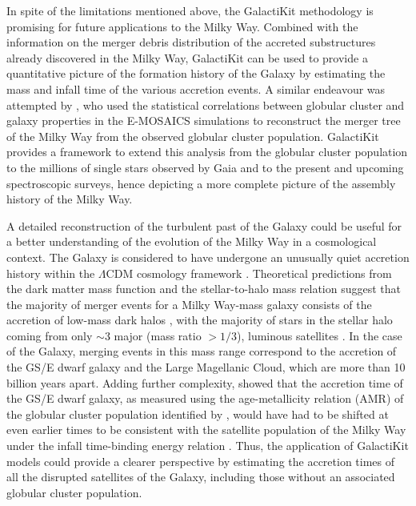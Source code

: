 In spite of the limitations mentioned above, the GalactiKit methodology is promising for future applications to the Milky Way. Combined with the information on the merger debris distribution of the accreted substructures already discovered in the Milky Way, GalactiKit can be used to provide a quantitative picture of the formation history of the Galaxy by estimating the mass and infall time of the various accretion events. A similar endeavour was attempted by \cite{Kruijssen2019b}, who used the statistical correlations between globular cluster and galaxy properties in the E-MOSAICS simulations \citep{Kruijssen2019a} to reconstruct the merger tree of the Milky Way from the observed globular cluster population. GalactiKit provides a framework to extend this analysis from the globular cluster population to the millions of single stars observed by Gaia and to the present and upcoming spectroscopic surveys, hence depicting a more complete picture of the assembly history of the Milky Way.


A detailed reconstruction of the turbulent past of the Galaxy could be useful for a better understanding of the evolution of the Milky Way in a cosmological context. The Galaxy is considered to have undergone an unusually quiet accretion history within the $\Lambda$CDM cosmology framework \citep{Hammer2007,Evans2020}. Theoretical predictions from the dark matter mass function \citep{Tinker2008} and the stellar-to-halo mass relation \citep{Brook2014} suggest that the majority of merger events for a Milky Way-mass galaxy consists of the accretion of low-mass dark halos \citep{Purcell2007}, with the majority of stars in the stellar halo coming from only $\sim$3 major (mass ratio $> 1/3$), luminous satellites \citep{Fakhouri2010}. In the case of the Galaxy, merging events in this mass range correspond to the accretion of the GS/E dwarf galaxy and the Large Magellanic Cloud, which are more than 10 billion years apart. Adding further complexity, \cite{Hammer2024} showed that the accretion time of the GS/E dwarf galaxy, as measured using the age-metallicity relation (AMR) of the globular cluster population identified by \citet{Kruijssen2019b}, would have had to be shifted at even earlier times to be consistent with the satellite population of the Milky Way under the infall time-binding energy relation \citep{Rocha2012}.
Thus, the application of GalactiKit models could provide a clearer perspective by estimating the accretion times of all the disrupted satellites of the Galaxy, including those without an associated globular cluster population. 


